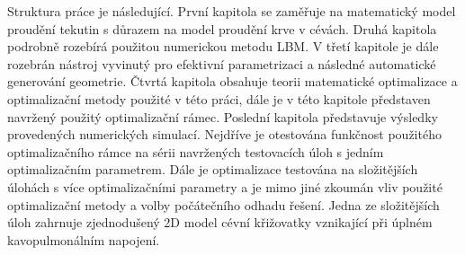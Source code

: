 Struktura práce je následující. První kapitola se zaměřuje na matematický model proudění tekutin s důrazem na model proudění krve v cévách. Druhá kapitola podrobně rozebírá použitou numerickou metodu LBM. V třetí kapitole je dále rozebrán nástroj vyvinutý pro efektivní parametrizaci a následné automatické generování geometrie. Čtvrtá kapitola obsahuje teorii matematické optimalizace a optimalizační metody použité v této práci, dále je v této kapitole představen navržený použitý optimalizační rámec. Poslední kapitola představuje výsledky provedených numerických simulací. Nejdříve je otestována funkčnost použitého optimalizačního rámce na sérii navržených testovacích úloh s jedním optimalizačním parametrem. Dále je optimalizace testována na složitějších úlohách s více optimalizačními parametry a je mimo jiné zkoumán vliv použité optimalizační metody a volby počátečního odhadu řešení. Jedna ze složitějších úloh zahrnuje zjednodušený 2D model cévní křižovatky vznikající při úplném kavopulmonálním napojení.



